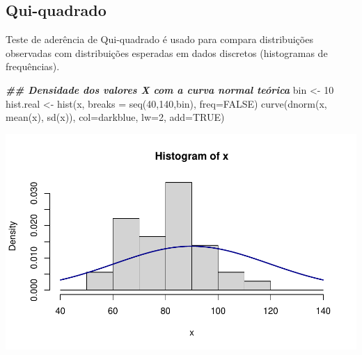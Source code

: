 \documentclass[
]{article}
\newenvironment{Shaded}{\begin{snugshade}}{\end{snugshade}}
\newcommand{\AttributeTok}[1]{\textcolor[rgb]{0.77,0.63,0.00}{#1}}
\newcommand{\ConstantTok}[1]{\textcolor[rgb]{0.00,0.00,0.00}{#1}}
\newcommand{\DecValTok}[1]{\textcolor[rgb]{0.00,0.00,0.81}{#1}}
\newcommand{\DocumentationTok}[1]{\textcolor[rgb]{0.56,0.35,0.01}{\textbf{\textit{#1}}}}
\newcommand{\FunctionTok}[1]{\textcolor[rgb]{0.00,0.00,0.00}{#1}}
\newcommand{\NormalTok}[1]{#1}
\newcommand{\OtherTok}[1]{\textcolor[rgb]{0.56,0.35,0.01}{#1}}
\newcommand{\SpecialCharTok}[1]{\textcolor[rgb]{0.00,0.00,0.00}{#1}}
\newcommand{\StringTok}[1]{\textcolor[rgb]{0.31,0.60,0.02}{#1}}
\begin{document}
\hypertarget{qui-quadrado}{%
\subsection{Qui-quadrado}\label{qui-quadrado}}

Teste de aderência de Qui-quadrado é usado para compara distribuições
observadas com distribuições esperadas em dados discretos (histogramas
de frequências).

\begin{Shaded}
\begin{Highlighting}[]
\DocumentationTok{\#\# Densidade dos valores X com a curva normal teórica}
\NormalTok{bin }\OtherTok{\textless{}{-}} \DecValTok{10}
\NormalTok{hist.real }\OtherTok{\textless{}{-}} \FunctionTok{hist}\NormalTok{(x, }\AttributeTok{breaks =} \FunctionTok{seq}\NormalTok{(}\DecValTok{40}\NormalTok{,}\DecValTok{140}\NormalTok{,bin), }\AttributeTok{freq=}\ConstantTok{FALSE}\NormalTok{)}
\FunctionTok{curve}\NormalTok{(}\FunctionTok{dnorm}\NormalTok{(x, }\FunctionTok{mean}\NormalTok{(x), }\FunctionTok{sd}\NormalTok{(x)), }\AttributeTok{col=}\StringTok{\textquotesingle{}darkblue\textquotesingle{}}\NormalTok{, }\AttributeTok{lw=}\DecValTok{2}\NormalTok{, }\AttributeTok{add=}\ConstantTok{TRUE}\NormalTok{)}
\end{Highlighting}
\end{Shaded}

\includegraphics{DistNormal_files/figure-latex/unnamed-chunk-16-1.pdf}

\begin{Shaded}
\end{Shaded}
\end{document}
